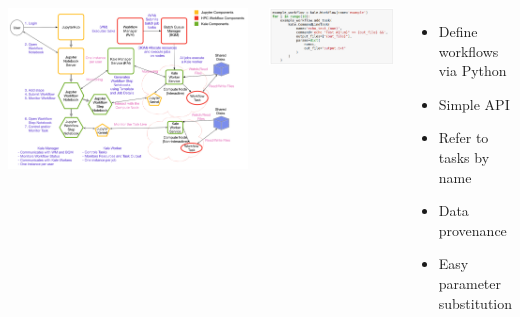 \documentclass{tikzposter}
\begin{document}
\begin{columns}
  {
     \includegraphics[width=\linewidth]{Kale_HPC}
 }
 
% 
% 
 {
    \begin{minipage}{.6\linewidth}
        \includegraphics[width=\linewidth]{../img/screenshot/define} \\
    \end{minipage}
    \begin{minipage}{.39\linewidth}
        \begin{itemize}
            \item Define workflows via Python
            \item Simple API
            \item Refer to tasks by name
            \item Data provenance
            \item Easy parameter substitution
        \end{itemize}
    \end{minipage}

    \vspace{-1.5em}
}


\end{columns}
\end{document}
